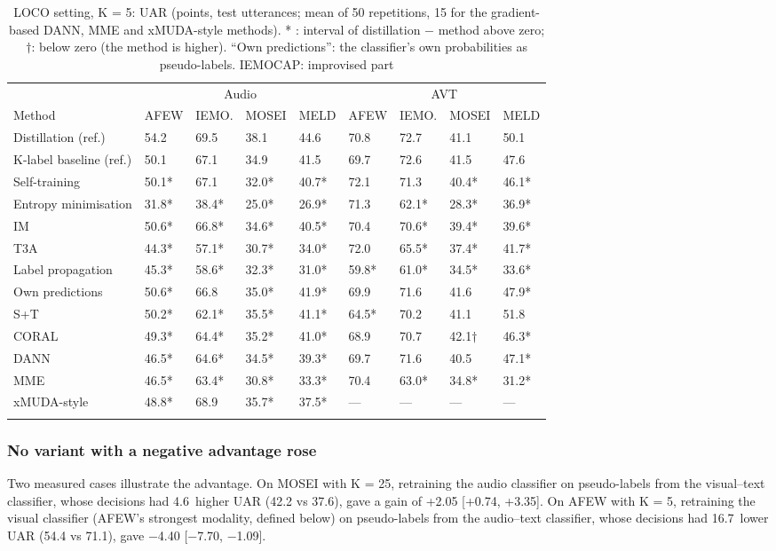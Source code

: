 \begin{table}[t]
\caption{LOCO setting, K = 5: UAR (points, test utterances; mean of 50 repetitions, 15 for the gradient-based DANN, MME and xMUDA-style methods). * : interval of distillation $-$ method above zero; $\dagger$: below zero (the method is higher). ``Own predictions'': the classifier's own probabilities as pseudo-labels. IEMOCAP: improvised part}\label{tab:methods}
\footnotesize\setlength{\tabcolsep}{4pt}
\begin{tabular}{@{}lllllllll@{}}
\toprule
 & \multicolumn{4}{c}{Audio} & \multicolumn{4}{c}{AVT} \\
Method & AFEW & IEMO. & MOSEI & MELD & AFEW & IEMO. & MOSEI & MELD \\
\midrule
Distillation (ref.) & 54.2 & 69.5 & 38.1 & 44.6 & 70.8 & 72.7 & 41.1 & 50.1 \\
K-label baseline (ref.) & 50.1 & 67.1 & 34.9 & 41.5 & 69.7 & 72.6 & 41.5 & 47.6 \\
Self-training & 50.1* & 67.1 & 32.0* & 40.7* & 72.1 & 71.3 & 40.4* & 46.1* \\
Entropy minimisation & 31.8* & 38.4* & 25.0* & 26.9* & 71.3 & 62.1* & 28.3* & 36.9* \\
IM & 50.6* & 66.8* & 34.6* & 40.5* & 70.4 & 70.6* & 39.4* & 39.6* \\
T3A & 44.3* & 57.1* & 30.7* & 34.0* & 72.0 & 65.5* & 37.4* & 41.7* \\
Label propagation & 45.3* & 58.6* & 32.3* & 31.0* & 59.8* & 61.0* & 34.5* & 33.6* \\
Own predictions & 50.6* & 66.8 & 35.0* & 41.9* & 69.9 & 71.6 & 41.6 & 47.9* \\
S+T & 50.2* & 62.1* & 35.5* & 41.1* & 64.5* & 70.2 & 41.1 & 51.8 \\
CORAL & 49.3* & 64.4* & 35.2* & 41.0* & 68.9 & 70.7 & 42.1$\dagger$ & 46.3* \\
DANN & 46.5* & 64.6* & 34.5* & 39.3* & 69.7 & 71.6 & 40.5 & 47.1* \\
MME & 46.5* & 63.4* & 30.8* & 33.3* & 70.4 & 63.0* & 34.8* & 31.2* \\
xMUDA-style & 48.8* & 68.9 & 35.7* & 37.5* & --- & --- & --- & --- \\
\botrule
\end{tabular}
\end{table}

\subsubsection{No variant with a negative advantage rose}\label{sec:rq1b-margin}
Two measured cases illustrate the advantage. On MOSEI with K = 25, retraining the audio classifier on pseudo-labels from the visual--text classifier, whose decisions had 4.6\pt\ higher UAR (42.2 vs 37.6), gave a gain of +2.05 [+0.74, +3.35]\pt. On AFEW with K = 5, retraining the visual classifier (AFEW's strongest modality, defined below) on pseudo-labels from the audio--text classifier, whose decisions had 16.7\pt\ lower UAR (54.4 vs 71.1), gave $-$4.40 [$-$7.70, $-$1.09]\pt.


